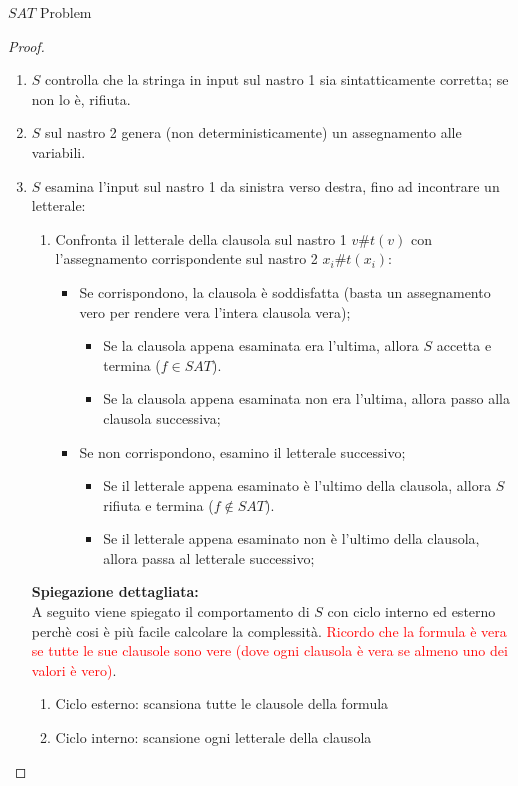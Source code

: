 \documentclass{article}  %
\theoremstyle{definition}
\begin{document}
\begin{theorem}{$SAT$ Problem}
\begin{proof}
\begin{enumerate}
			\item $S$ controlla che la stringa in input sul nastro 1 sia sintatticamente corretta; se non lo è, rifiuta.
			\item $S$ sul nastro 2 genera (non deterministicamente) un assegnamento alle variabili.
			\item $S$ esamina l'input sul nastro 1 da sinistra verso destra, fino ad incontrare un letterale:
			      \begin{enumerate}
				      \item Confronta il letterale della clausola sul nastro 1 $v\#t(v)$ con l'assegnamento corrispondente sul nastro 2 $x_i\#t(x_i)$:
				            \begin{itemize}
					            \item Se corrispondono, la clausola è soddisfatta (basta un assegnamento vero per rendere vera l'intera clausola vera);
					                  \begin{itemize}
						                  \item Se la clausola appena esaminata era l'ultima, allora $S$ accetta e termina ($f \in SAT$).
						                  \item Se la clausola appena esaminata non era l'ultima, allora passo alla clausola successiva;
					                  \end{itemize}
					            \item Se non corrispondono, esamino il letterale successivo;
					                  \begin{itemize}
						                  \item Se il letterale appena esaminato è l'ultimo della clausola, allora $S$ rifiuta e termina ($f \notin SAT$).
						                  \item Se il letterale appena esaminato non è l'ultimo della clausola, allora passa al letterale successivo;
					                  \end{itemize}
				            \end{itemize}
			      \end{enumerate}

			      \textbf{Spiegazione dettagliata:} \\
			      A seguito viene spiegato il comportamento di $S$ con ciclo interno ed esterno perchè cosi è più facile calcolare la complessità.
			      \textcolor{red}{Ricordo che la formula è vera se tutte le sue clausole sono vere (dove ogni clausola è vera se almeno uno dei valori è vero)}.
			      \begin{enumerate}
				      \item Ciclo esterno: scansiona tutte le clausole della formula
				      \item Ciclo interno: scansione ogni letterale della clausola
			      \end{enumerate}


\end{enumerate}
\end{proof}
\end{theorem}
\end{document}
